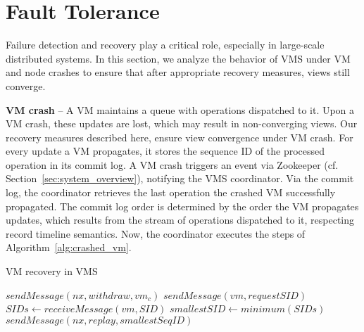 \section{Fault Tolerance}
\label{sec:fault_tolerance}

Failure detection and recovery play a critical role, especially in
large-scale distributed systems.  In this section, we analyze the
behavior of VMS under VM and node crashes to ensure that after
appropriate recovery measures, views still converge.

\noindent
\textbf{VM crash} -- A VM maintains a queue with operations dispatched
to it. Upon a VM crash, these updates are lost, which may result in
non-converging views. Our recovery measures described here, ensure
view convergence under VM crash. For every update a VM propagates, it
stores the sequence ID of the processed operation in its commit log. A
VM crash triggers an event via Zookeeper
(cf. Section~\ref{sec:system_overview}), notifying the VMS
coordinator. Via the commit log, the coordinator retrieves the last
operation the crashed VM successfully propagated. The commit log order
is determined by the order the VM propagates updates, which results
from the stream of operations dispatched to it, respecting record
timeline semantics. Now, the coordinator executes the steps of
Algorithm~\ref{alg:crashed_vm}.



\begin{algorithm}
\caption{VM recovery in VMS}
\label{alg:crashed_vm}
\begin{algorithmic}[5]
\State $sendMessage(nx, withdraw, vm_c)$
\State $sendMessage(vm, requestSID)$
\EndFor
{}	
\State $SIDs \leftarrow receiveMessage(vm, SID)$	
\EndFor
\State $smallestSID \leftarrow minimum(SIDs)$
\State $sendMessage(nx, replay, smallestSeqID)$	
\EndProcedure
\end{algorithmic}
\end{algorithm}

